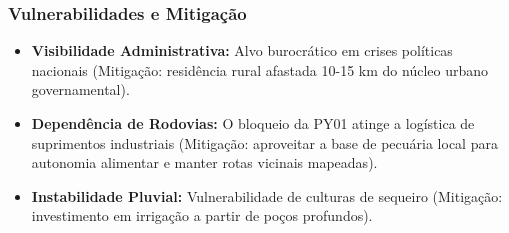 \subsubsection{Vulnerabilidades e
Mitigação}

\begin{itemize}
\tightlist
\item
  \textbf{Visibilidade Administrativa:} Alvo burocrático em crises
  políticas nacionais (Mitigação: residência rural afastada 10-15 km do
  núcleo urbano governamental).
\item
  \textbf{Dependência de Rodovias:} O bloqueio da PY01 atinge a
  logística de suprimentos industriais (Mitigação: aproveitar a base de
  pecuária local para autonomia alimentar e manter rotas vicinais
  mapeadas).
\item
  \textbf{Instabilidade Pluvial:} Vulnerabilidade de culturas de
  sequeiro (Mitigação: investimento em irrigação a partir de poços
  profundos).
\end{itemize}

